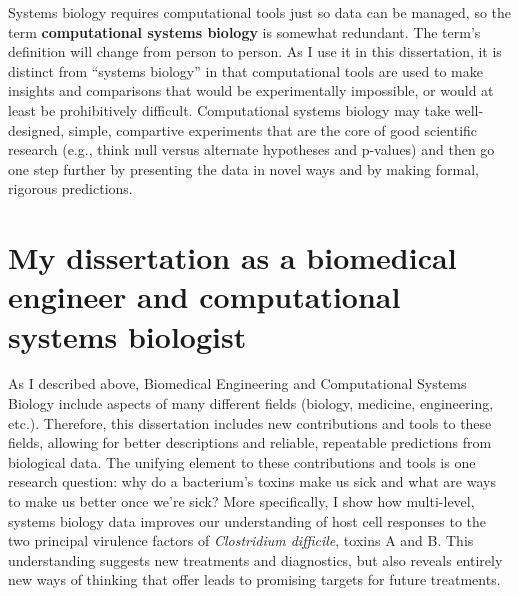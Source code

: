 Systems biology requires computational tools just so data 
can be managed, so the term \textbf{computational systems biology} 
is somewhat redundant. The term’s definition will change 
from person to person. As I use it in this dissertation, 
it is distinct from ``systems biology'' in that computational tools 
are used to make insights and comparisons that would be experimentally 
impossible, or would at least be prohibitively difficult.
Computational systems biology may take well-designed, simple, 
compartive experiments that are the core of good scientific 
research (e.g., think null versus 
alternate hypotheses and p-values) and then go one step further
by presenting the data in novel ways and by making formal, rigorous predictions. 


\section[My dissertation as systems biologist]{My dissertation as a biomedical engineer 
              and computational systems biologist}

As I described above, Biomedical Engineering and Computational Systems
Biology include aspects of many different fields (biology, medicine, engineering, etc.).
Therefore, this dissertation includes new contributions and tools to these fields, 
allowing for better descriptions and reliable, repeatable predictions from biological data.
The unifying element to these contributions and tools is one research question:
why do a bacterium's toxins make us sick and what are ways
to make us better once we're sick? More specifically,
I show how multi-level, systems biology data improves our understanding of host cell responses 
to the two principal virulence factors of \textit{Clostridium difficile}, toxins A and B. 
This understanding suggests new treatments and diagnostics, but also 
reveals entirely new ways of thinking that offer leads to promising targets
for future treatments. 
















